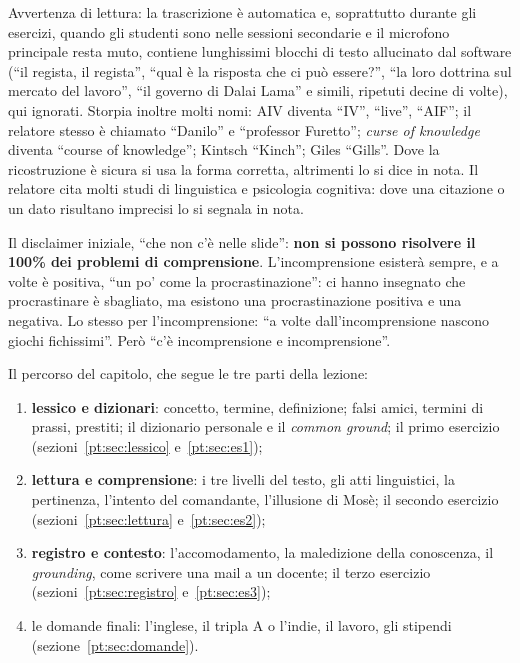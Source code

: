 Avvertenza di lettura: la trascrizione è automatica e, soprattutto durante gli
esercizi, quando gli studenti sono nelle sessioni secondarie e il microfono
principale resta muto, contiene lunghissimi blocchi di testo allucinato dal
software (``il regista, il regista'', ``qual è la risposta che ci può
essere?'', ``la loro dottrina sul mercato del lavoro'', ``il governo di Dalai
Lama'' e simili, ripetuti decine di volte), qui ignorati. Storpia inoltre
molti nomi: AIV diventa ``IV'', ``live'', ``AIF''; il relatore stesso è
chiamato ``Danilo'' e ``professor Furetto''; \emph{curse of knowledge} diventa
``course of knowledge''; Kintsch ``Kinch''; Giles ``Gills''. Dove la
ricostruzione è sicura si usa la forma corretta, altrimenti lo si dice in nota.
Il relatore cita molti studi di linguistica e psicologia cognitiva: dove una
citazione o un dato risultano imprecisi lo si segnala in nota.

Il disclaimer iniziale, ``che non c'è nelle slide'': \textbf{non si possono
risolvere il 100\% dei problemi di comprensione}. L'incomprensione esisterà
sempre, e a volte è positiva, ``un po' come la procrastinazione'': ci hanno
insegnato che procrastinare è sbagliato, ma esistono una procrastinazione
positiva e una negativa. Lo stesso per l'incomprensione: ``a volte
dall'incomprensione nascono giochi fichissimi''. Però ``c'è incomprensione e
incomprensione''.

Il percorso del capitolo, che segue le tre parti della lezione:
\begin{enumerate}
  \item \textbf{lessico e dizionari}: concetto, termine, definizione; falsi
        amici, termini di prassi, prestiti; il dizionario personale e il
        \emph{common ground}; il primo esercizio
        (sezioni~\ref{pt:sec:lessico} e~\ref{pt:sec:es1});
  \item \textbf{lettura e comprensione}: i tre livelli del testo, gli atti
        linguistici, la pertinenza, l'intento del comandante, l'illusione di
        Mosè; il secondo esercizio
        (sezioni~\ref{pt:sec:lettura} e~\ref{pt:sec:es2});
  \item \textbf{registro e contesto}: l'accomodamento, la maledizione della
        conoscenza, il \emph{grounding}, come scrivere una mail a un docente;
        il terzo esercizio (sezioni~\ref{pt:sec:registro}
        e~\ref{pt:sec:es3});
  \item le domande finali: l'inglese, il tripla A o l'indie, il lavoro, gli
        stipendi (sezione~\ref{pt:sec:domande}).
\end{enumerate}

